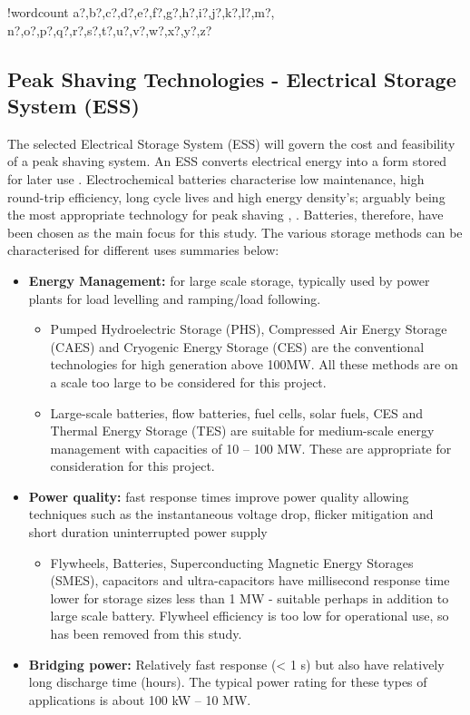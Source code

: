 \documentclass[fontsize=9.5pt]{extarticle}
\providecommand{\tightlist}{%
  \setlength{\itemsep}{0pt}\setlength{\parskip}{0pt}}
\newcounter{words}
\newenvironment{counted}{%
  \setcounter{words}{0}
  \SearchList!{wordcount}{\stepcounter{words}}
    {a?,b?,c?,d?,e?,f?,g?,h?,i?,j?,k?,l?,m?,
    n?,o?,p?,q?,r?,s?,t?,u?,v?,w?,x?,y?,z?}
  \UndoBoundary{'}
  \SearchOrder{p;}}{%
  \StopSearching}
\begin{document}
\begin{counted}
\subsection{Peak Shaving Technologies - Electrical Storage System
(ESS)}\label{peak-shaving-technologies---electrical-storage-system-ess}

The selected Electrical Storage System (ESS) will govern the cost and
feasibility of a peak shaving system. An ESS converts electrical energy
into a form stored for later use \cite{Chen2009291}. Electrochemical
batteries characterise low maintenance, high round-trip efficiency, long
cycle lives and high energy density's; arguably being the most
appropriate technology for peak shaving \cite{liao2016a},
\cite{Dunn928}. Batteries, therefore, have been chosen as the main focus
for this study. The various storage methods can be characterised for
different uses summaries below:

\begin{itemize}
\tightlist
\item
  \textbf{Energy Management:} for large scale storage, typically used by
  power plants for load levelling and ramping/load following.

  \begin{itemize}
  \tightlist
  \item
    Pumped Hydroelectric Storage (PHS), Compressed Air Energy Storage
    (CAES) and Cryogenic Energy Storage (CES) are the conventional
    technologies for high generation above 100MW. All these methods are
    on a scale too large to be considered for this project.
  \item
    Large-scale batteries, flow batteries, fuel cells, solar fuels, CES
    and Thermal Energy Storage (TES) are suitable for medium-scale
    energy management with capacities of 10 -- 100 MW. These are
    appropriate for consideration for this project.
  \end{itemize}
\item
  \textbf{Power quality:} fast response times improve power quality
  allowing techniques such as the instantaneous voltage drop, flicker
  mitigation and short duration uninterrupted power supply

  \begin{itemize}
  \tightlist
  \item
    Flywheels, Batteries, Superconducting Magnetic Energy Storages
    (SMES), capacitors and ultra-capacitors have millisecond response
    time lower for storage sizes less than 1 MW - suitable perhaps in
    addition to large scale battery. Flywheel efficiency is too low for
    operational use, so has been removed from this study.
  \end{itemize}
\item
  \textbf{Bridging power:} Relatively fast response (\textless{} 1 s)
  but also have relatively long discharge time (hours). The typical
  power rating for these types of applications is about 100 kW -- 10 MW.


\end{itemize}
\end{counted}
\end{document}
